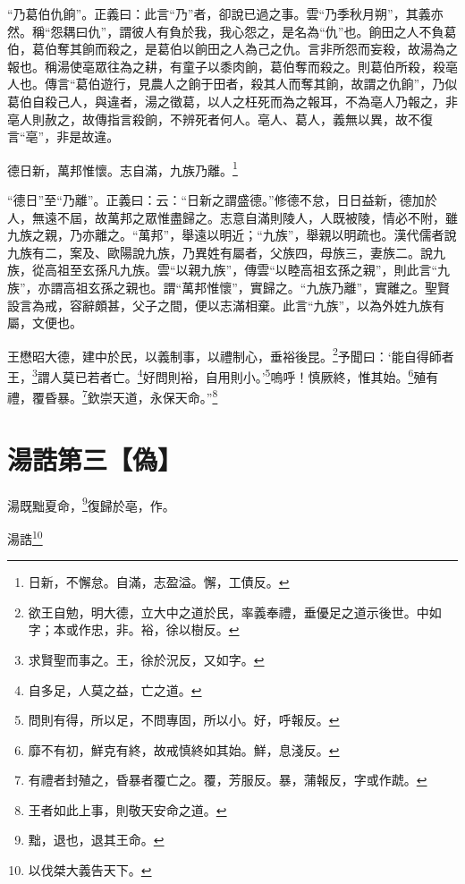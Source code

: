 {\noindent\shu{}\fzkt “乃葛伯仇餉”。正義曰：此言“乃”者，卻說已過之事。雲“乃季秋月朔”，其義亦然。稱“怨耦曰仇”，謂彼人有負於我，我心怨之，是名為“仇”也。餉田之人不負葛伯，葛伯奪其餉而殺之，是葛伯以餉田之人為己之仇。言非所怨而妄殺，故湯為之報也。稱湯使亳眾往為之耕，有童子以黍肉餉，葛伯奪而殺之。則葛伯所殺，殺亳人也。傳言“葛伯遊行，見農人之餉于田者，殺其人而奪其餉，故謂之仇餉”，乃似葛伯自殺己人，與違者，湯之徵葛，以人之枉死而為之報耳，不為亳人乃報之，非亳人則赦之，故傳指言殺餉，不辨死者何人。亳人、葛人，義無以異，故不復言“亳”，非是故違。 \par}

德日新，萬邦惟懷。志自滿，九族乃離。\footnote{日新，不懈怠。自滿，志盈溢。懈，工債反。}

{\noindent\shu{}\fzkt “德日”至“乃離”。正義曰：云：“日新之謂盛德。”修德不怠，日日益新，德加於人，無遠不屆，故萬邦之眾惟盡歸之。志意自滿則陵人，人既被陵，情必不附，雖九族之親，乃亦離之。“萬邦”，舉遠以明近；“九族”，舉親以明疏也。漢代儒者說九族有二，案及、歐陽說九族，乃異姓有屬者，父族四，母族三，妻族二。說九族，從高祖至玄孫凡九族。雲“以親九族”，傳雲“以睦高祖玄孫之親”，則此言“九族”，亦謂高祖玄孫之親也。謂“萬邦惟懷”，實歸之。“九族乃離”，實離之。聖賢設言為戒，容辭頗甚，父子之間，便以志滿相棄。此言“九族”，以為外姓九族有屬，文便也。 \par}

王懋昭大德，建中於民，以義制事，以禮制心，垂裕後昆。\footnote{欲王自勉，明大德，立大中之道於民，率義奉禮，垂優足之道示後世。中如字；本或作忠，非。裕，徐以樹反。}予聞曰：‘能自得師者王，\footnote{求賢聖而事之。王，徐於況反，又如字。}謂人莫已若者亡。\footnote{自多足，人莫之益，亡之道。}好問則裕，自用則小。’\footnote{問則有得，所以足，不問專固，所以小。好，呼報反。}嗚呼！慎厥終，惟其始。\footnote{靡不有初，鮮克有終，故戒慎終如其始。鮮，息淺反。}殖有禮，覆昏暴。\footnote{有禮者封殖之，昏暴者覆亡之。覆，芳服反。暴，蒲報反，字或作虣。}欽崇天道，永保天命。”\footnote{王者如此上事，則敬天安命之道。}

\section{湯誥第三【偽】}

湯既黜夏命，\footnote{黜，退也，退其王命。}復歸於亳，作。

湯誥\footnote{以伐桀大義告天下。}

